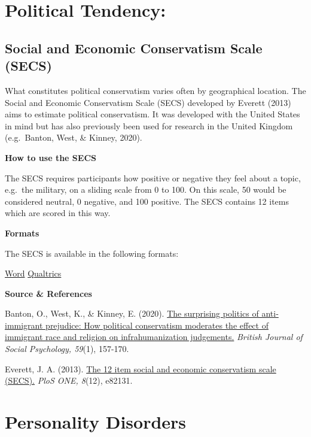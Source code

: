 \documentclass[
]{book}
\begin{document}
\hypertarget{political-tendency}{%
\section{Political Tendency:}\label{political-tendency}}

\hypertarget{social-and-economic-conservatism-scale-secs}{%
\subsection{Social and Economic Conservatism Scale (SECS)}\label{social-and-economic-conservatism-scale-secs}}

What constitutes political conservatism varies often by geographical location. The Social and Economic Conservatism Scale (SECS) developed by Everett (2013) aims to estimate political conservatism. It was developed with the United States in mind but has also previously been used for research in the United Kingdom (e.g.~Banton, West, \& Kinney, 2020).

\textbf{How to use the SECS}

The SECS requires participants how positive or negative they feel about a topic, e.g.~the military, on a sliding scale from 0 to 100. On this scale, 50 would be considered neutral, 0 negative, and 100 positive. The SECS contains 12 items which are scored in this way.

\textbf{Formats}

The SECS is available in the following formats:

\href{link\%20to\%20file}{Word} \textbar{} \href{link\%20to\%20file}{Qualtrics}

\textbf{Source \& References}

Banton, O., West, K., \& Kinney, E. (2020). \href{https://onlinelibrary.wiley.com/doi/pdf/10.1111/bjso.12337}{The surprising politics of anti‐immigrant prejudice: How political conservatism moderates the effect of immigrant race and religion on infrahumanization judgements.} \emph{British Journal of Social Psychology, 59}(1), 157-170.

Everett, J. A. (2013). \href{https://journals.plos.org/plosone/article/file?id=10.1371/journal.pone.0082131\&type=printable}{The 12 item social and economic conservatism scale (SECS).} \emph{PloS ONE, 8}(12), e82131.

\hypertarget{personality-disorders}{%
\section{Personality Disorders}\label{personality-disorders}}
\end{document}
